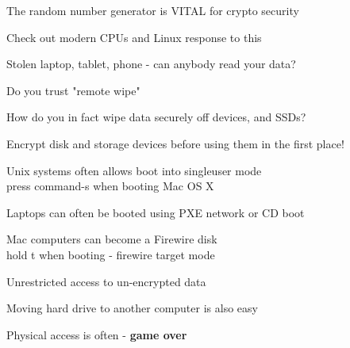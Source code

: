 \documentclass[Screen16to9,17pt]{foils}
\begin{document}







{\small{}}

\centerline{The random number generator is VITAL for crypto security}

Check out modern CPUs and Linux response to this\\




\begin{list1}
\item Stolen laptop, tablet, phone - can anybody read your data?
\item Do you trust "remote wipe"
\item How do you in fact wipe data securely off devices, and SSDs?
\item Encrypt disk and storage devices before using them in the first place!
\end{list1}


\begin{list1}
\item Unix systems often allows boot into singleuser mode\\
press command-s when booting Mac OS X
\item Laptops can often be booted using PXE network or CD boot
\item Mac computers can become a Firewire disk\\
hold t when booting - firewire target mode
\item Unrestricted access to un-encrypted data
\item Moving hard drive to another computer is also easy
\end{list1}
\pause
\centerline{Physical access is often - {\bf game over}}
\end{document}
